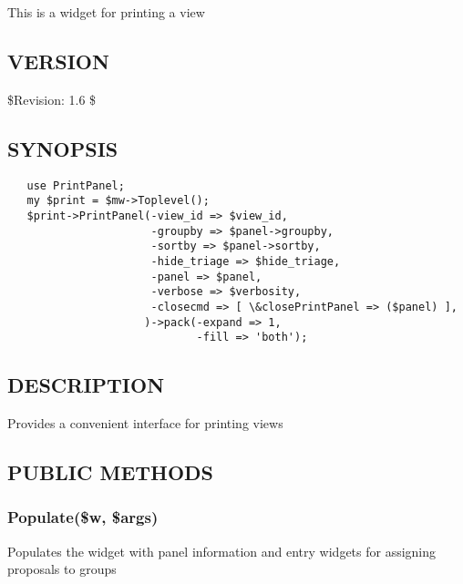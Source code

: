 \documentclass{article}
\begin{document}
This is a widget for printing a view

\subsection*{VERSION\label{PrintPanel_VERSION}}


\$Revision: 1.6 \$

\subsection*{SYNOPSIS\label{PrintPanel_SYNOPSIS}}
\begin{verbatim}
   use PrintPanel;
   my $print = $mw->Toplevel();
   $print->PrintPanel(-view_id => $view_id,
                      -groupby => $panel->groupby,
                      -sortby => $panel->sortby,
                      -hide_triage => $hide_triage,
                      -panel => $panel,
                      -verbose => $verbosity,
                      -closecmd => [ \&closePrintPanel => ($panel) ],
                     )->pack(-expand => 1,
                             -fill => 'both');
\end{verbatim}
\subsection*{DESCRIPTION\label{PrintPanel_DESCRIPTION}}


Provides a convenient interface for printing views

\subsection*{PUBLIC METHODS\label{PrintPanel_PUBLIC_METHODS}}
\subsubsection*{Populate(\$w, \$args)\label{PrintPanel_Populate_w_args_}}


Populates the widget with panel information and entry widgets for assigning
proposals to groups
\end{document}
